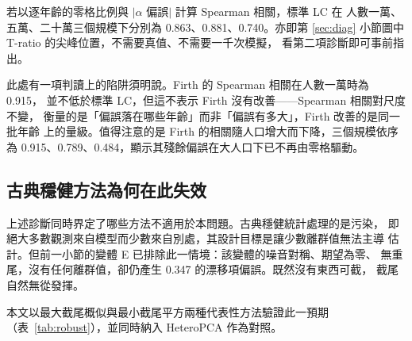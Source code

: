 \documentclass[UTF8, fontset=macnew, a4paper, 12pt]{ctexart}
\begin{document}
若以逐年齡的零格比例與 $|\alpha$ 偏誤$|$ 計算 Spearman 相關，標準 LC 在
人數一萬、五萬、二十萬三個規模下分別為 0.863、0.881、0.740。亦即第
\ref{sec:diag} 小節圖中 T-ratio 的尖峰位置，不需要真值、不需要一千次模擬，
看第二項診斷即可事前指出。

此處有一項判讀上的陷阱須明說。Firth 的 Spearman 相關在人數一萬時為 0.915，
並不低於標準 LC，但這不表示 Firth 沒有改善——Spearman 相關對尺度不變，
衡量的是「偏誤落在哪些年齡」而非「偏誤有多大」，Firth 改善的是同一批年齡
上的量級。值得注意的是 Firth 的相關隨人口增大而下降，三個規模依序為
0.915、0.789、0.484，顯示其殘餘偏誤在大人口下已不再由零格驅動。

\subsection{古典穩健方法為何在此失效}

上述診斷同時界定了哪些方法不適用於本問題。古典穩健統計處理的是污染，
即絕大多數觀測來自模型而少數來自別處，其設計目標是讓少數離群值無法主導
估計。但前一小節的變體 E 已排除此一情境：該變體的噪音對稱、期望為零、
無重尾，沒有任何離群值，卻仍產生 0.347 的漂移項偏誤。既然沒有東西可截，
截尾自然無從發揮。

本文以最大截尾概似與最小截尾平方兩種代表性方法驗證此一預期
（表~\ref{tab:robust}），並同時納入 HeteroPCA 作為對照。
\end{document}
